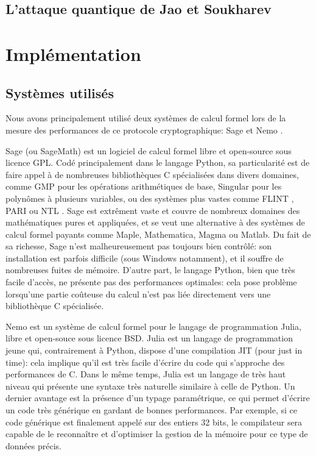 \documentclass[11pt,a4paper]{article}
\theoremstyle{definition}
\begin{document}
\subsection{L'attaque quantique de Jao et Soukharev}



\newpage

\section{Implémentation}

\subsection{Systèmes utilisés}

Nous avons principalement utilisé deux systèmes de calcul formel lors de la mesure des performances de ce protocole cryptographique: Sage \cite{Sage} et Nemo \cite{Nemo}.

Sage (ou SageMath) est un logiciel de calcul formel libre et open-source sous licence GPL. Codé principalement dans le langage Python, sa particularité est de faire appel à de nombreuses bibliothèques C spécialisées dans divers domaines, comme GMP \cite{GMP} pour les opérations arithmétiques de base, Singular pour les polynômes à plusieurs variables, ou des systèmes plus vastes comme FLINT \cite{FLINT}, PARI \cite{PARI} ou NTL \cite{NTL}. Sage est extrêment vaste et couvre de nombreux domaines des mathématiques pures et appliquées, et se veut une alternative à des systèmes de calcul formel payants comme Maple, Mathematica, Magma ou Matlab. Du fait de sa richesse, Sage n'est malheureusement pas toujours bien contrôlé: son installation est parfois difficile (sous Windows notamment), et il souffre de nombreuses fuites de mémoire. D'autre part, le langage Python, bien que très facile d'accès, ne présente pas des performances optimales: cela pose problème lorsqu'une partie coûteuse du calcul n'est pas liée directement vers une bibliothèque C spécialisée.

Nemo est un système de calcul formel pour le langage de programmation Julia, libre et open-souce sous licence BSD. Julia est un langage de programmation jeune qui, contrairement à Python, dispose d'une compilation JIT (pour \og just in time\fg): cela implique qu'il est très facile d'écrire du code qui s'approche des performances de C. Dans le même temps, Julia est un langage de très haut niveau qui présente une syntaxe très naturelle similaire à celle de Python. Un dernier avantage est la présence d'un typage paramétrique, ce qui permet d'écrire un code très générique en gardant de bonnes performances. Par exemple, si ce code générique est finalement appelé sur des entiers 32 bits, le compilateur sera capable de le reconnaître et d'optimiser la gestion de la mémoire pour ce type de données précis.
\end{document}
